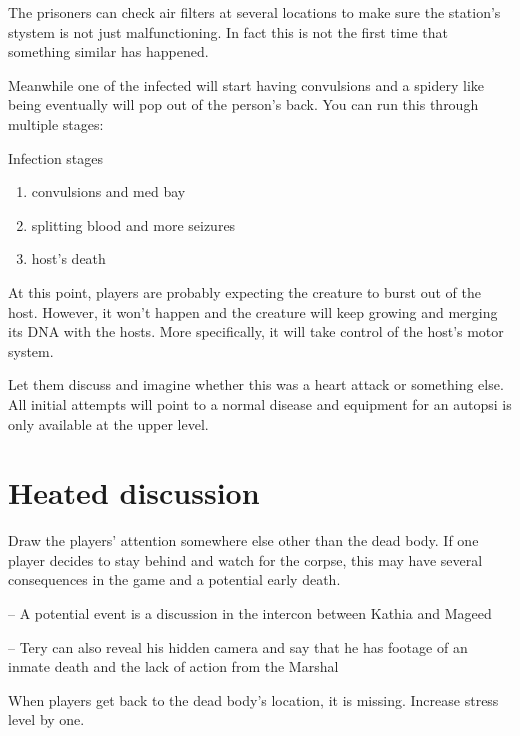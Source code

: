 The prisoners can check air filters at several locations to make sure the station's stystem is not just malfunctioning. In fact this is not the first time that something similar has happened. 


Meanwhile one of the infected will start having convulsions and a spidery like being eventually will pop out of the person's back. 
You can run this through multiple stages: 



\begin{rpg-commentbox}{Infection stages}
    \begin{enumerate}
        \item convulsions and med bay
        \item splitting blood and more seizures
        \item host's death
    \end{enumerate}

    At this point, players are probably expecting the creature to burst out of the host. However, it won't happen and the creature will keep growing and merging its DNA with the hosts. More specifically, it will take control of the host's motor system.

    Let them discuss and imagine whether this was a heart attack or something else. All initial attempts will point to a normal disease and equipment for an autopsi is only available at the upper level.
\end{rpg-commentbox}





\newsect

\section{Heated discussion}

Draw the players' attention somewhere else other than the dead body. If one player decides to stay behind and watch for the corpse, this may have several consequences in the game and a potential early death.

-- A potential event is a discussion in the intercon between Kathia and Mageed

-- Tery can also reveal his hidden camera and say that he has footage of an inmate death and the lack of action from the Marshal

\newsect


When players get back to the dead body's location, it is missing. Increase stress level by one.

